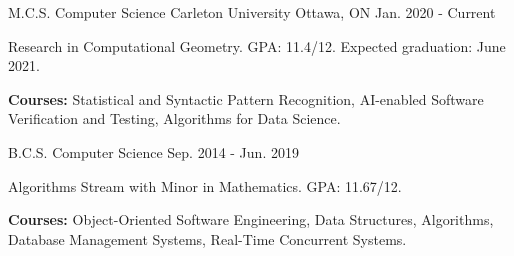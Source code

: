 \begin{cventries}

\educationentry
{M.C.S. Computer Science}
{Carleton University}
{Ottawa, ON}
{Jan. 2020 - Current}
{\begin{cvitems}
    \item {Research in Computational Geometry. GPA: 11.4/12. Expected graduation: June 2021.}
    \item {\textbf{Courses:} Statistical and Syntactic Pattern Recognition, AI-enabled Software Verification and Testing, Algorithms for Data Science.}
\end{cvitems}}
{B.C.S. Computer Science}
{Sep. 2014 - Jun. 2019}
{\begin{cvitems}
    \item {Algorithms Stream with Minor in Mathematics. GPA: 11.67/12.}
    \item {\textbf{Courses:} Object-Oriented Software Engineering, Data Structures, Algorithms, Database Management Systems, Real-Time Concurrent Systems.}
\end{cvitems}}

\end{cventries}
